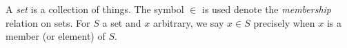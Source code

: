 \guard

\begin{defn}
\label{defn:set}
  A \emph{set} is a collection of things.
\label{defn:membership}
\index{$\in$}
  The symbol $\in$ is used denote the \emph{membership} relation on sets.
  For $S$ a set and $x$ arbitrary, we say $x\in S$ precisely when $x$ is a member (or element) of $S$.
\end{defn}
